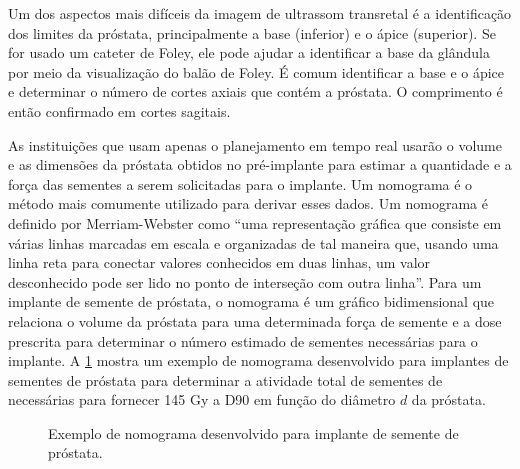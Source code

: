 \documentclass[11pt,a4paper]{article}
\newcounter{exemplo}
\begin{document}
	Um dos aspectos mais difíceis da imagem de ultrassom transretal é a identificação dos limites da próstata, principalmente a base (inferior) e o ápice (superior). Se for usado um cateter de Foley, ele pode ajudar a identificar a base da glândula por meio da visualização do balão de Foley. É comum identificar a base e o ápice e determinar o número de cortes axiais que contém a próstata. O comprimento é então confirmado em cortes sagitais.

	As instituições que usam apenas o planejamento em tempo real usarão o volume e as dimensões da próstata obtidos no pré-implante para estimar a quantidade e a força das sementes a serem solicitadas para o implante. Um nomograma é o método mais comumente utilizado para derivar esses dados. Um nomograma é definido por Merriam-Webster como “uma representação gráfica que consiste em várias linhas marcadas em escala e organizadas de tal maneira que, usando uma linha reta para conectar valores conhecidos em duas linhas, um valor desconhecido pode ser lido no ponto de interseção com outra linha”. Para um implante de semente de próstata, o nomograma é um gráfico bidimensional que relaciona o volume da próstata para uma determinada força de semente e a dose prescrita para determinar o número estimado de sementes necessárias para o implante. A \ref{fig:nomogramaImplanteProstata} mostra um exemplo de nomograma desenvolvido para implantes de sementes de próstata para determinar a atividade total de sementes de  necessárias para fornecer 145 Gy a D90 em função do diâmetro $d$ da próstata.

	\begin{figure}[h]
		\centering
		\caption{Exemplo de nomograma desenvolvido para implante de semente de próstata.}
		\label{fig:nomogramaImplanteProstata}
	\end{figure}
\end{document}
